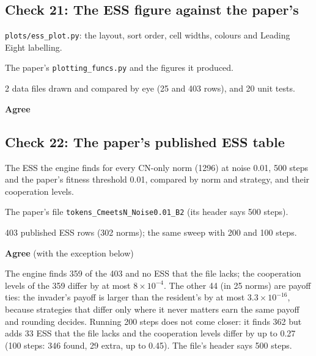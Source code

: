\subsection*{Check 21: The ESS figure against the paper's}

\begin{description}\setlength\itemsep{0pt}

\item[What was checked] \texttt{plots/ess\_plot.py}: the layout, sort order, cell widths, colours and Leading Eight labelling.

\item[Checked against] The paper's \texttt{plotting\_funcs.py} and the figures it produced.

\item[How many] 2 data files drawn and compared by eye (25 and 403 rows), and 20 unit tests.

\item[Result] \textbf{Agree}

\end{description}


\subsection*{Check 22: The paper's published ESS table}

\begin{description}\setlength\itemsep{0pt}

\item[What was checked] The ESS the engine finds for every CN-only norm (1296) at noise 0.01, 500 steps and the paper's fitness threshold 0.01, compared by norm and strategy, and their cooperation levels.

\item[Checked against] The paper's file \texttt{tokens\_CmeetsN\_Noise0.01\_B2} (its header says 500 steps).

\item[How many] 403 published ESS rows (302 norms); the same sweep with 200 and 100 steps.

\item[Result] \textbf{Agree} (with the exception below)

\item[Note] The engine finds 359 of the 403 and no ESS that the file lacks; the cooperation levels of the 359 differ by at most $8\times10^{-4}$. The other 44 (in 25 norms) are payoff ties: the invader's payoff is larger than the resident's by at most $3.3\times10^{-16}$, because strategies that differ only where it never matters earn the same payoff and rounding decides. Running 200 steps does not come closer: it finds 362 but adds 33 ESS that the file lacks and the cooperation levels differ by up to 0.27 (100 steps: 346 found, 29 extra, up to 0.45). The file's header says 500 steps.

\end{description}


